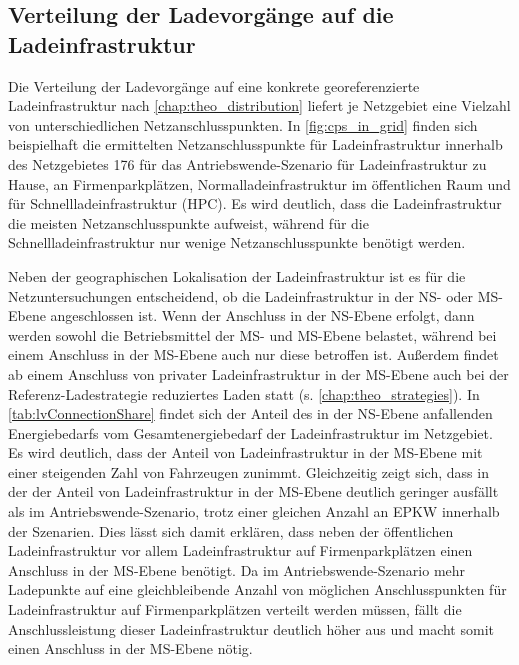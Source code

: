 \subsection{Verteilung der Ladevorgänge auf die Ladeinfrastruktur}\label{chap:distribute_demand_ev}

Die Verteilung der Ladevorgänge auf eine konkrete georeferenzierte Ladeinfrastruktur nach \autoref{chap:theo_distribution} liefert je Netzgebiet eine Vielzahl von unterschiedlichen Netzanschlusspunkten.
In \autoref{fig:cps_in_grid} finden sich beispielhaft die ermittelten Netzanschlusspunkte für Ladeinfrastruktur innerhalb des Netzgebietes \num{176} für das Antriebswende-Szenario für Ladeinfrastruktur zu Hause, an Firmenparkplätzen, Normalladeinfrastruktur im öffentlichen Raum und für Schnellladeinfrastruktur (\gls{HPC}).
Es wird deutlich, dass die Ladeinfrastruktur \zH die meisten Netzanschlusspunkte aufweist, während für die Schnellladeinfrastruktur nur wenige Netzanschlusspunkte benötigt werden.



Neben der geographischen Lokalisation der Ladeinfrastruktur ist es für die Netzuntersuchungen entscheidend, ob die Ladeinfrastruktur in der \gls{NS}- oder \gls{MS}-Ebene angeschlossen ist.
Wenn der Anschluss in der \gls{NS}-Ebene erfolgt, dann werden sowohl die Betriebsmittel der \gls{MS}- und \gls{MS}-Ebene belastet, während bei einem Anschluss in der \gls{MS}-Ebene auch nur diese betroffen ist.
Außerdem findet ab einem Anschluss von privater Ladeinfrastruktur in der \gls{MS}-Ebene auch bei der Referenz-Ladestrategie reduziertes Laden statt (s. \autoref{chap:theo_strategies}).
In \autoref{tab:lvConnectionShare} findet sich der Anteil des in der \gls{NS}-Ebene anfallenden Energiebedarfs vom Gesamtenergiebedarf der Ladeinfrastruktur im Netzgebiet.
Es wird deutlich, dass der Anteil von Ladeinfrastruktur in der \gls{MS}-Ebene mit einer steigenden Zahl von Fahrzeugen zunimmt.
Gleichzeitig zeigt sich, dass in der \SzeFirmenparkplatz der Anteil von Ladeinfrastruktur in der \gls{MS}-Ebene deutlich geringer ausfällt als im Antriebswende-Szenario, trotz einer gleichen Anzahl an \gls{EPKW} innerhalb der Szenarien.
Dies lässt sich damit erklären, dass neben der öffentlichen Ladeinfrastruktur vor allem Ladeinfrastruktur auf Firmenparkplätzen einen Anschluss in der \gls{MS}-Ebene benötigt.
Da im Antriebswende-Szenario mehr Ladepunkte auf eine gleichbleibende Anzahl von möglichen Anschlusspunkten für Ladeinfrastruktur auf Firmenparkplätzen verteilt werden müssen, fällt die Anschlussleistung dieser Ladeinfrastruktur deutlich höher aus und macht somit einen Anschluss in der \gls{MS}-Ebene nötig.

